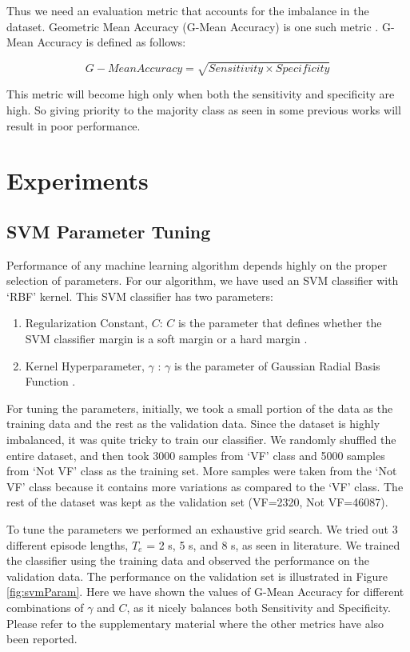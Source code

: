 \documentclass[12pt,a4paper]{article}
\begin{document}
Thus we need an evaluation metric that accounts for the imbalance in the dataset. Geometric Mean Accuracy (G-Mean Accuracy) is one such metric \cite{barandela2003strategies}. G-Mean Accuracy is defined as follows:

\begin{equation}
G-Mean Accuracy=\sqrt{Sensitivity \times Specificity}
\end{equation}


  This metric will become high only when both the sensitivity and specificity are high. So giving priority to the majority class as seen in some previous works will result in poor performance.


\section{Experiments}

\subsection{SVM Parameter Tuning}
\label{svm2}
Performance of any machine learning algorithm depends highly on the proper selection of parameters. For our algorithm, we have used an SVM classifier with `RBF' kernel. This SVM classifier has two parameters:

\begin{enumerate}
    \item Regularization Constant, $C$: $C$ is the parameter that defines whether the SVM classifier margin is a soft margin or a hard margin \cite{cortes1995support}.
    \item Kernel Hyperparameter, $\gamma$ : $\gamma$ is the parameter of Gaussian Radial Basis Function \cite{cortes1995support}.
\end{enumerate}

For tuning the parameters, initially, we took a small portion of the data as the training data and the rest as the validation data. Since the dataset is highly imbalanced, it was quite tricky to train our classifier. We randomly shuffled the entire dataset, and then took 3000 samples from `VF' class and 5000 samples from `Not VF' class as the training set. More samples were taken from the `Not VF' class because it contains more variations as compared to the `VF' class. The rest of the dataset was kept as the validation set (VF=2320, Not VF=46087).

To tune the parameters we performed an exhaustive grid search. We tried out 3 different episode lengths, $T_e$ = 2 s, 5 s, and 8 s, as seen in literature. We trained the classifier using the training data and observed the performance on the validation data. The performance on the validation set is illustrated in Figure \ref{fig:svmParam}. Here we have shown the values of G-Mean Accuracy for different combinations of $\gamma$ and $C$, as it nicely balances both Sensitivity and Specificity. Please refer to the supplementary material where the other metrics have also been reported.
\end{document}
